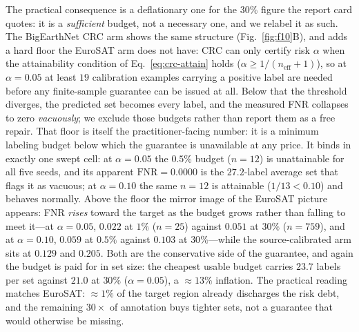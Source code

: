 \documentclass[preprint,11pt,authoryear]{elsarticle}
\begin{document}
The practical consequence is a deflationary one for the $30\%$ figure the report card quotes: it is a
\emph{sufficient} budget, not a necessary one, and we relabel it as such.
The BigEarthNet CRC arm shows the same structure (Fig.~\ref{fig:f10}B), and adds a hard floor the EuroSAT arm does not
have: CRC can only certify risk $\alpha$ when the attainability condition of Eq.~\eqref{eq:crc-attain}
holds ($\alpha \ge 1/(n_\mathrm{eff}{+}1)$), so at
$\alpha{=}0.05$ at least $19$ calibration examples carrying a positive label are needed before any
finite-sample guarantee can be issued at all. Below that the threshold diverges, the predicted set
becomes every label, and the measured FNR collapses to zero \emph{vacuously}; we exclude those budgets
rather than report them as a free repair. That floor is itself the practitioner-facing number: it is a
minimum labeling budget below which the guarantee is unavailable at any price. It binds in exactly one
swept cell: at $\alpha{=}0.05$ the $0.5\%$ budget ($n{=}12$) is unattainable for all five seeds, and its
apparent $\mathrm{FNR}{=}0.0000$ is the $27.2$-label average set that flags it as vacuous; at
$\alpha{=}0.10$ the same $n{=}12$ is attainable ($1/13 < 0.10$) and behaves normally. Above the floor
the mirror image of the EuroSAT picture appears: FNR \emph{rises} toward the target as the budget grows
rather than falling to meet it---at $\alpha{=}0.05$, $0.022$ at $1\%$ ($n{=}25$) against $0.051$ at
$30\%$ ($n{=}759$), and at $\alpha{=}0.10$, $0.059$ at $0.5\%$ against $0.103$ at $30\%$---while the
source-calibrated arm sits at $0.129$ and $0.205$. Both are the conservative side of the guarantee, and
again the budget is paid for in set size: the cheapest usable budget carries $23.7$ labels per set
against $21.0$ at $30\%$ ($\alpha{=}0.05$), a ${\approx}13\%$ inflation. The practical reading matches
EuroSAT: ${\approx}1\%$ of the target region already discharges the risk debt, and the remaining $30\times$
of annotation buys tighter sets, not a guarantee that would otherwise be missing.
\end{document}
